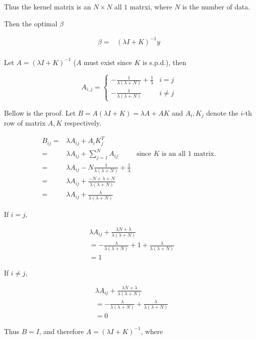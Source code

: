\documentclass[fleqn,a4paper,12pt]{article}
\begin{document}
Thus the kernel matrix is an $N \times N$ all $1$ matrxi, where $N$ is the number of data.

Then the optimal $\beta$

\begin{align*}
  \beta =& (\lambda I + K)^{-1} y \\
\end{align*}

Let $A = (\lambda I + K)^{-1}$ ($A$ must exist since $K$ is s.p.d.), then 

\[A_{i,j}  = 
\begin{cases}
  - \frac{1}{\lambda (\lambda + N)} + \frac{1}{\lambda} & i = j \\
  - \frac{1}{\lambda (\lambda + N)} & i \ne j
\end{cases}
\]

Bellow is the proof. Let $B = A(\lambda I + K) = \lambda A + AK$ and $A_{i}, K_{j}$ denote the $i$-th row of matrix $A, K$ respectively. 


\begin{align*}
  B_{ij}
  =& \lambda A_{ij} + A_{i} K_{j}^T \\
  =& \lambda A_{ij} + \sum_{j=1}^N A_{ij} & \text{since $K$ is an all $1$ matrix.} \\
  =& \lambda A_{ij} - N \frac{1}{\lambda(\lambda + N)} + \frac{1}{\lambda} \\
  =& \lambda A_{ij} + \frac{- N + \lambda + N}{\lambda(\lambda + N)} \\
  =& \lambda A_{ij} + \frac{\lambda}{\lambda(\lambda + N)}
\end{align*}

If $i = j$,

\begin{align*}
  &  \lambda A_{ij} + \frac{\lambda N + \lambda}{\lambda(\lambda + N)} \\
  &= - \frac{\lambda}{\lambda(\lambda + N)} + 1 + \frac{\lambda}{\lambda(\lambda + N)} \\
  &= 1
\end{align*}


If $i \ne j$,

\begin{align*}
  &  \lambda A_{ij} + \frac{\lambda N + \lambda}{\lambda(\lambda + N)} \\
  &= - \frac{\lambda}{\lambda(\lambda + N)} + \frac{\lambda}{\lambda(\lambda + N)} \\
  &= 0
\end{align*}

Thus $B = I$, and therefore $A = (\lambda I + K)^{-1}$, where
\end{document}
